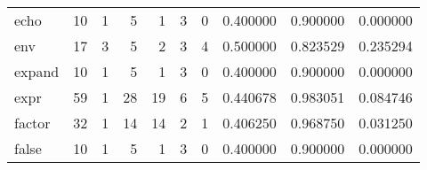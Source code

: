\begin{longtable}{lrrrrrrrrr}
echo      &                                       10 &                                                  1 &                                                  5 &                                                  1 &                                                  3 &                                                  0 &                                           0.400000 &                               0.900000 &                             0.000000 \\
env       &                                       17 &                                                  3 &                                                  5 &                                                  2 &                                                  3 &                                                  4 &                                           0.500000 &                               0.823529 &                             0.235294 \\
expand    &                                       10 &                                                  1 &                                                  5 &                                                  1 &                                                  3 &                                                  0 &                                           0.400000 &                               0.900000 &                             0.000000 \\
expr      &                                       59 &                                                  1 &                                                 28 &                                                 19 &                                                  6 &                                                  5 &                                           0.440678 &                               0.983051 &                             0.084746 \\
factor    &                                       32 &                                                  1 &                                                 14 &                                                 14 &                                                  2 &                                                  1 &                                           0.406250 &                               0.968750 &                             0.031250 \\
false     &                                       10 &                                                  1 &                                                  5 &                                                  1 &                                                  3 &                                                  0 &                                           0.400000 &                               0.900000 &                             0.000000 \\

\end{longtable}
